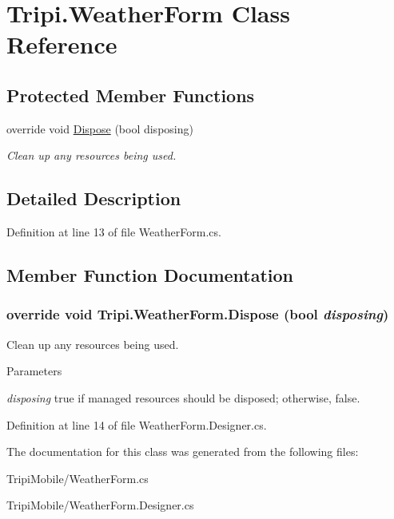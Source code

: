 \hypertarget{class_tripi_1_1_weather_form}{
\section{Tripi.WeatherForm Class Reference}
\label{class_tripi_1_1_weather_form}
}
\subsection*{Protected Member Functions}
\begin{DoxyCompactItemize}
\item 
override void \hyperlink{class_tripi_1_1_weather_form_a70d4351bfc8cf0aefd8246db04a83825}{Dispose} (bool disposing)
\begin{DoxyCompactList}\small\item\em Clean up any resources being used. \item\end{DoxyCompactList}\end{DoxyCompactItemize}


\subsection{Detailed Description}


Definition at line 13 of file WeatherForm.cs.

\subsection{Member Function Documentation}
\hypertarget{class_tripi_1_1_weather_form_a70d4351bfc8cf0aefd8246db04a83825}{
\subsubsection[{Dispose}]{\setlength{\rightskip}{0pt plus 5cm}override void Tripi.WeatherForm.Dispose (bool {\em disposing})}}
\label{class_tripi_1_1_weather_form_a70d4351bfc8cf0aefd8246db04a83825}


Clean up any resources being used. 
\begin{DoxyParams}{Parameters}
\item[{\em disposing}]true if managed resources should be disposed; otherwise, false.\end{DoxyParams}


Definition at line 14 of file WeatherForm.Designer.cs.

The documentation for this class was generated from the following files:\begin{DoxyCompactItemize}
\item 
TripiMobile/WeatherForm.cs\item 
TripiMobile/WeatherForm.Designer.cs\end{DoxyCompactItemize}
